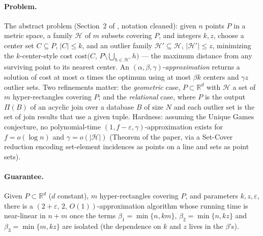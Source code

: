 \paragraph{Problem.}
The abstract problem (Section~2 of \citep{sigmod26-289}, notation
cleaned): given $n$ points $P$ in a metric space, a family
$\mathcal{H}$ of $m$ subsets covering $P$, and integers $k, z$, choose a
center set $C \subseteq P$, $|C| \le k$, and an outlier family
$\mathcal{H}' \subseteq \mathcal{H}$, $|\mathcal{H}'| \le z$, minimizing
the $k$-center-style cost $\mathrm{cost}\bigl(C,\, P \setminus
\bigcup_{h \in \mathcal{H}'} h\bigr)$ --- the maximum distance from any
surviving point to its nearest center. An
$(\alpha,\beta,\gamma)$-\emph{approximation} returns a solution of cost
at most $\alpha$ times the optimum using at most $\beta k$ centers and
$\gamma z$ outlier sets. Two refinements matter: the \emph{geometric}
case, $P \subset \mathbb{R}^d$ with $\mathcal{H}$ a set of $m$
hyper-rectangles covering $P$; and the \emph{relational} case, where $P$
is the output $\Pi(B)$ of an acyclic join over a database $B$ of size
$N$ and each outlier set is the set of join results that use a given
tuple. Hardness: assuming the Unique Games conjecture, no
polynomial-time $(1, f-\varepsilon, \gamma)$-approximation exists for
$f = o(\log n)$ and $\gamma = o(|\mathcal{H}|)$ (Theorem of the paper,
via a Set-Cover reduction encoding set-element incidences as points on a
line and sets as point sets).

\paragraph{Guarantee.}

\begin{theorem}\label{thm:cor-soc-main}
Given $P \subset \mathbb{R}^d$ ($d$ constant), $m$ hyper-rectangles
covering $P$, and parameters $k, z, \varepsilon$, there is a
$(2+\varepsilon,\,2,\,O(1))$-approximation algorithm whose running time
is near-linear in $n + m$ once the terms $\beta_1 = \min\{n, km\}$,
$\beta_2 = \min\{n, kz\}$ and $\beta_3 = \min\{m, kz\}$ are isolated
(the dependence on $k$ and $z$ lives in the $\beta$'s). \eop
\end{theorem}


